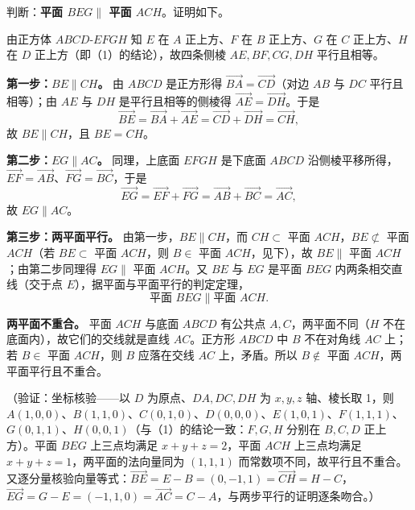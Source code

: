 \begin{answer}

判断：\textbf{平面 \(BEG\parallel\) 平面 \(ACH\)}。证明如下。

由正方体 \(ABCD\text{-}EFGH\) 知 \(E\) 在 \(A\) 正上方、\(F\) 在 \(B\) 正上方、\(G\) 在 \(C\) 正上方、\(H\) 在 \(D\) 正上方（即（1）的结论），故四条侧棱 \(AE,BF,CG,DH\) 平行且相等。

\textbf{第一步：\(BE\parallel CH\)。} 由 \(ABCD\) 是正方形得 \(\overrightarrow{BA}=\overrightarrow{CD}\)（对边 \(AB\) 与 \(DC\) 平行且相等）；由 \(AE\) 与 \(DH\) 是平行且相等的侧棱得 \(\overrightarrow{AE}=\overrightarrow{DH}\)。于是
\nopagebreak[4]
\[
\overrightarrow{BE}=\overrightarrow{BA}+\overrightarrow{AE}=\overrightarrow{CD}+\overrightarrow{DH}=\overrightarrow{CH},
\]
故 \(BE\parallel CH\)，且 \(BE=CH\)。

\textbf{第二步：\(EG\parallel AC\)。} 同理，上底面 \(EFGH\) 是下底面 \(ABCD\) 沿侧棱平移所得，\(\overrightarrow{EF}=\overrightarrow{AB}\)、\(\overrightarrow{FG}=\overrightarrow{BC}\)，于是
\nopagebreak[4]
\[
\overrightarrow{EG}=\overrightarrow{EF}+\overrightarrow{FG}=\overrightarrow{AB}+\overrightarrow{BC}=\overrightarrow{AC},
\]
故 \(EG\parallel AC\)。

\textbf{第三步：两平面平行。} 由第一步，\(BE\parallel CH\)，而 \(CH\subset\) 平面 \(ACH\)，\(BE\not\subset\) 平面 \(ACH\)（若 \(BE\subset\) 平面 \(ACH\)，则 \(B\in\) 平面 \(ACH\)，见下），故 \(BE\parallel\) 平面 \(ACH\)；由第二步同理得 \(EG\parallel\) 平面 \(ACH\)。又 \(BE\) 与 \(EG\) 是平面 \(BEG\) 内两条相交直线（交于点 \(E\)），据平面与平面平行的判定定理，
\nopagebreak[4]
\[
\text{平面 }BEG\parallel\text{平面 }ACH .
\]

\textbf{两平面不重合。} 平面 \(ACH\) 与底面 \(ABCD\) 有公共点 \(A,C\)，两平面不同（\(H\) 不在底面内），故它们的交线就是直线 \(AC\)。正方形 \(ABCD\) 中 \(B\) 不在对角线 \(AC\) 上；若 \(B\in\) 平面 \(ACH\)，则 \(B\) 应落在交线 \(AC\) 上，矛盾。所以 \(B\notin\) 平面 \(ACH\)，两平面平行且不重合。

（验证：坐标核验——以 \(D\) 为原点、\(DA,DC,DH\) 为 \(x,y,z\) 轴、棱长取 1，则 \(A(1,0,0)\)、\(B(1,1,0)\)、\(C(0,1,0)\)、\(D(0,0,0)\)、\(E(1,0,1)\)、\(F(1,1,1)\)、\(G(0,1,1)\)、\(H(0,0,1)\)（与（1）的结论一致：\(F,G,H\) 分别在 \(B,C,D\) 正上方）。平面 \(BEG\) 上三点均满足 \(x+y+z=2\)，平面 \(ACH\) 上三点均满足 \(x+y+z=1\)，两平面的法向量同为 \((1,1,1)\) 而常数项不同，故平行且不重合。又逐分量核验向量等式：\(\overrightarrow{BE}=E-B=(0,-1,1)=\overrightarrow{CH}=H-C\)，\(\overrightarrow{EG}=G-E=(-1,1,0)=\overrightarrow{AC}=C-A\)，与两步平行的证明逐条吻合。）


\end{answer}

